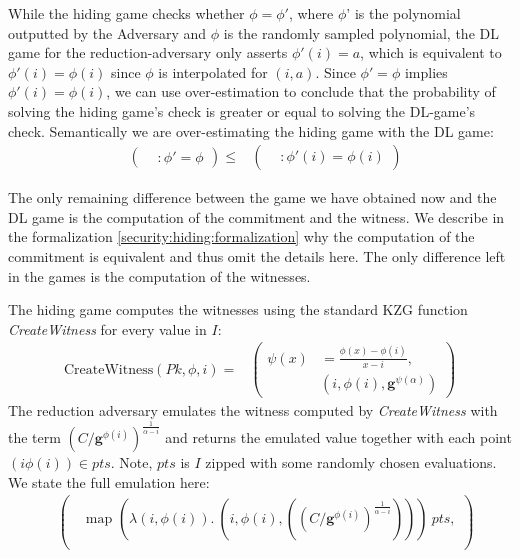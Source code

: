 While the hiding game checks whether $\phi=\phi'$, where $\phi$' is the polynomial outputted by the Adversary and  $\phi$ is the randomly sampled polynomial, the DL game for the reduction-adversary only asserts $\phi'(i)=a$, which is equivalent to $\phi'(i)=\phi(i)$ since $\phi$ is interpolated for $(i, a)$. Since $\phi'=\phi$ implies $\phi'(i)=\phi(i)$, we can use over-estimation to conclude that the probability of solving the hiding game's check is greater or equal to solving the DL-game's check. Semantically we are over-estimating the hiding game with the DL game: 
\begin{equation*}
    \begin{aligned}
        &\left(
            \begin{aligned}
                &: \phi'=\phi
            \end{aligned}
        \right)
        \le&\left(
            \begin{aligned}
                &: \phi'(i)=\phi(i)
            \end{aligned}
        \right)
    \end{aligned}
\end{equation*}

The only remaining difference between the game we have obtained now and the DL game is the computation of the commitment and the witness. We describe in the formalization \ref{security:hiding:formalization} why the computation of the commitment is equivalent and thus omit the details here. 
The only difference left in the games is the computation of the witnesses. 

The hiding game computes the witnesses using the standard KZG function \textit{CreateWitness} for every value in $I$:  
\begin{equation*}
    \begin{aligned}
        \text{CreateWitness}(Pk,\phi,i)=&\left(
            \begin{aligned}
                \psi(x) &= \frac{\phi(x)-\phi(i)}{x-i}, \\
                & (i,\phi(i), \mathbf{g}^{\psi(\alpha)})
            \end{aligned}
        \right)
    \end{aligned}
\end{equation*}
The reduction adversary emulates the witness computed by \textit{CreateWitness} with the term $(C/\mathbf{g}^{\phi(i)})^{\frac{1}{\alpha-i}}$ and returns the emulated value together with each point $(i\phi(i))\in pts$. Note, $pts$ is $I$ zipped with some randomly chosen evaluations. We state the full emulation here:
\begin{equation*}
    \begin{aligned}
        &\left(
            \begin{aligned}
                &\text{map } (\lambda (i,\phi(i)).\ (i,\phi(i), ((C/\mathbf{g}^{\phi(i)})^{\frac{1}{\alpha-i}})))\ pts,\\
            \end{aligned}
        \right)
    \end{aligned}
\end{equation*}

